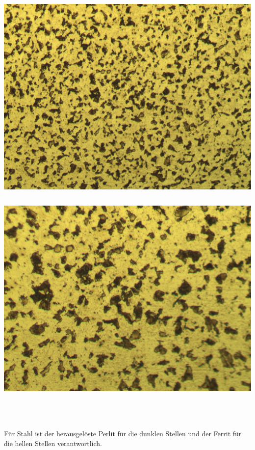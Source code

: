 \documentclass[german,  %
parskip=full,  %
]{scrartcl}
\begin{document}
\begin{minipage}{0.45\textwidth}\centering
\includegraphics[scale=0.1]{St_2Sch_5s_10x_001.jpg}
\end{minipage}
\begin{minipage}{0.1\textwidth}\centering
\[\]
\end{minipage}
\begin{minipage}{0.45\textwidth}\centering
\includegraphics[scale=0.1]{St_2Sch_5s_20x_001.jpg}
\end{minipage} \\\\\\
Für Stahl ist der herausgelöste Perlit für die dunklen Stellen und der Ferrit für die hellen Stellen verantwortlich.
\end{document}
